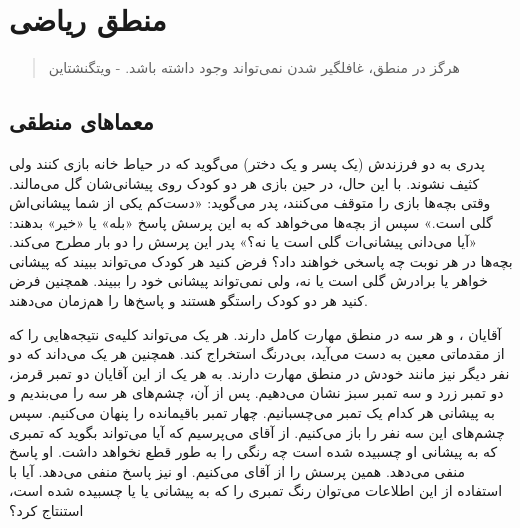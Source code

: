 \chapter{منطق ریاضی}
\thispagestyle{empty}

\begin{quote}
	{\lotus
		هرگز در منطق، غافلگیر شدن نمی‌تواند وجود داشته باشد. \quad - ویتگنشتاین%
	}
\end{quote}

\section{معماهای منطقی}
\begin{problem} \label{loprpedar}
	پدری به دو فرزندش (یک پسر و یک دختر) می‌گوید که در حیاط خانه بازی کنند ولی کثیف نشوند. با این حال، در حین بازی هر دو کودک روی پیشانی‌شان گل می‌مالند. وقتی بچه‌ها بازی را متوقف می‌کنند، پدر می‌گوید: «دست‌کم یکی از شما پیشانی‌اش گلی است.» سپس از بچه‌ها می‌خواهد که به این پرسش پاسخ «بله» یا «خیر» بدهند: «آیا می‌دانی پیشانی‌ات گلی است یا نه؟» پدر این پرسش را دو بار مطرح می‌کند. بچه‌ها در هر نوبت چه پاسخی خواهند داد؟ فرض کنید هر کودک می‌تواند ببیند که پیشانی خواهر یا برادرش گلی است یا نه، ولی نمی‌تواند پیشانی خود را ببیند. همچنین فرض کنید هر دو کودک راستگو هستند و پاسخ‌ها را هم‌زمان می‌دهند.
\end{problem}

\begin{problem} \label{loprabccolor}
	آقایان
	،  و 
	هر سه در منطق مهارت کامل دارند. هر یک می‌تواند کلیه‌ی نتیجه‌هایی را که از مقدماتی معین به دست می‌آید، بی‌درنگ استخراج کند. همچنین هر یک می‌داند که دو نفر دیگر نیز مانند خودش در منطق مهارت دارند. به هر یک از این آقایان دو تمبر قرمز، دو تمبر زرد و سه تمبر سبز نشان می‌دهیم. پس از آن، چشم‌های هر سه را می‌بندیم و به پیشانی هر کدام یک تمبر می‌چسبانیم. چهار تمبر باقیمانده را پنهان می‌کنیم. سپس چشم‌های این سه نفر را باز می‌کنیم. از آقای
	می‌پرسیم که آیا می‌تواند بگوید که تمبری که به پیشانی او چسبیده شده است چه رنگی را به طور قطع نخواهد داشت. او پاسخ منفی می‌دهد. همین پرسش را از آقای
	می‌کنیم. او نیز پاسخ منفی می‌دهد.
	آیا با استفاده از این اطلاعات می‌توان رنگ تمبری را که به پیشانی
	 یا  یا 
	چسبیده شده است، استنتاج کرد؟
\end{problem}

